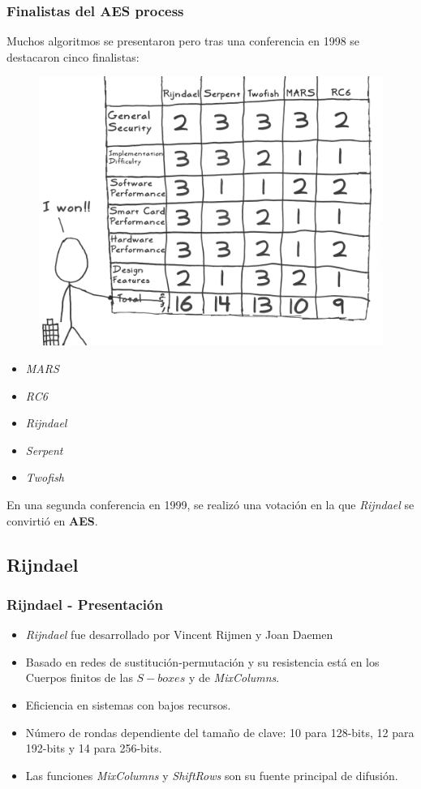 \documentclass{beamer}
\begin{document}
	\begin{frame}
	\frametitle{Finalistas del AES process}
	Muchos algoritmos se presentaron pero tras una conferencia en 1998 se destacaron cinco finalistas:
	\begin{figure}
		\includegraphics[width=0.85\linewidth]{./Images/xkcd-votos.png}\\
	\end{figure}
	\begin{itemize}
		\item \textit{MARS}
		\item \textit{RC6}
		\item \textit{Rijndael}
		\item \textit{Serpent}
		\item \textit{Twofish}
	\end{itemize}
	
	\vspace{1cm}
	
	En una segunda conferencia en 1999, se realizó una votación en la que \textit{Rijndael} se convirtió en \textbf{AES}.
	\end{frame}
	
	\subsection{Rijndael}
	\begin{frame}
	\frametitle{Rijndael - Presentación}
	\begin{itemize}
		\item \textit{Rijndael} fue desarrollado por Vincent Rijmen y Joan Daemen
		
		\item Basado en redes de sustitución-permutación y su resistencia está en los Cuerpos finitos de las $S-boxes$ y de \textit{MixColumns}.
		
		\item Eficiencia en sistemas con bajos recursos.
		
		\item Número de rondas dependiente del tamaño de clave: 10 para 128-bits, 12 para 192-bits y 14 para 256-bits.
		
		\item Las funciones \textit{MixColumns} y \textit{ShiftRows} son su fuente principal de difusión.
	\end{itemize}	
	\end{frame}
\end{document}
